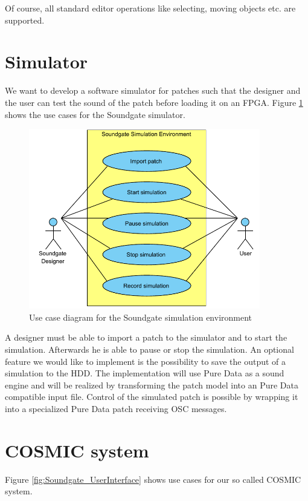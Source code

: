 Of course, all standard editor operations like selecting, moving objects etc. are supported.

\section{Simulator}

We want to develop a software simulator for patches such that the designer and the user can test the sound of the patch before loading it on an \ac{FPGA}. Figure \ref{fig:Soundgate_Simulator} shows the use cases for the Soundgate simulator.

	\begin{figure}[!h]
		\centering
			\includegraphics[width=0.90\textwidth]{images/Soundgate_Simulator.pdf}
		\caption{Use case diagram for the Soundgate simulation environment}
		\label{fig:Soundgate_Simulator}
	\end{figure}

A designer must be able to import a patch to the simulator and to start the simulation. Afterwards he is able to pause or stop the simulation. An optional feature we would like to implement is the possibility to save the output of a simulation to the HDD. The implementation will use Pure Data as a sound engine and will be realized by transforming the patch model into an Pure Data compatible input file. Control of the simulated patch is possible by wrapping it into a specialized Pure Data patch receiving OSC messages.

\section{COSMIC system}
	Figure \ref{fig:Soundgate_UserInterface} shows use cases for our so called \ac{COSMIC} system. 
	
